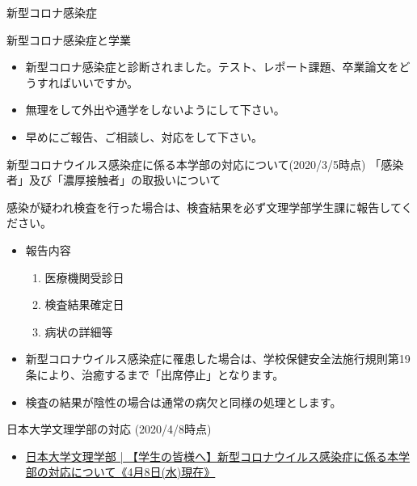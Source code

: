 \documentclass[a4j,10pt]{jsarticle}
\def\lthtmlcheckvsize{\ifdim\ht\sizebox<\vsize 
  \ifdim\wd\sizebox<\hsize\expandafter\hfill\fi \expandafter\vfill
  \else\expandafter\vss\fi}%
\begin{document}
{\newpage\clearpage
{}%
\begin{frame}[label={sec:org3e5f598},fragile]{新型コロナ感染症}
\begin{block}{新型コロナ感染症と学業}
\begin{itemize}
\item 新型コロナ感染症と診断されました。テスト、レポート課題、卒業論文をどうすればいいですか。
\item 無理をして外出や通学をしないようにして下さい。
\item 早めにご報告、ご相談し、対応をして下さい。
\end{itemize}
\par
\begin{block}{新型コロナウイルス感染症に係る本学部の対応について(2020/3/5時点)}
「感染者」及び「濃厚接触者」の取扱いについて
\par
感染が疑われ検査を行った場合は、検査結果を必ず文理学部学生課に報告してください。
\begin{itemize}
\item 報告内容
\begin{enumerate}
\item 医療機関受診日
\item 検査結果確定日
\item 病状の詳細等
\end{enumerate}
\item 新型コロナウイルス感染症に罹患した場合は、学校保健安全法施行規則第19条により、治癒するまで「出席停止」となります。
\item 検査の結果が陰性の場合は通常の病欠と同様の処理とします。
\end{itemize}
\end{block}
\par
\begin{block}{日本大学文理学部の対応 (2020/4/8時点)}
\begin{itemize}
\item \href{https://www.chs.nihon-u.ac.jp/student/2020-04-08/15016/}{日本大学文理学部 | 【学生の皆様へ】新型コロナウイルス感染症に係る本学部の対応について《4月8日(水)現在》}
\end{itemize}
\end{block}
\end{block}
\end{frame}%
\lthtmlfigureZ
\lthtmlcheckvsize\clearpage}
\end{document}
